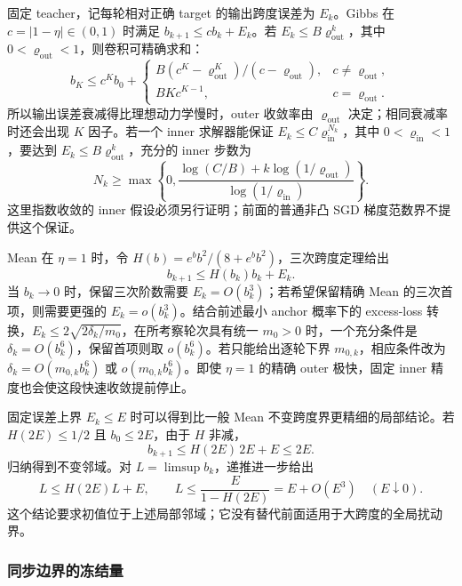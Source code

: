 \documentclass[lang=cn,scheme=chinese,openany]{../book/elegantbook}
\begin{document}
固定 teacher，记每轮相对正确 target 的输出跨度误差为 $E_k$。Gibbs 在 $c=|1-\eta|\in(0,1)$ 时满足 $b_{k+1}\le cb_k+E_k$。若 $E_k\le B\varrho_{\mathrm{out}}^k$，其中 $0<\varrho_{\mathrm{out}}<1$，则卷积可精确求和：
\begin{equation*}
 b_K\le c^Kb_0+
 \begin{cases}
 B(c^K-\varrho_{\mathrm{out}}^K)/(c-\varrho_{\mathrm{out}}),&c\ne\varrho_{\mathrm{out}},\\
 BKc^{K-1},&c=\varrho_{\mathrm{out}}.
 \end{cases}
\end{equation*}
所以输出误差衰减得比理想动力学慢时，outer 收敛率由 $\varrho_{\mathrm{out}}$ 决定；相同衰减率时还会出现 $K$ 因子。若一个 inner 求解器能保证 $E_k\le C\varrho_{\mathrm{in}}^{N_k}$，其中 $0<\varrho_{\mathrm{in}}<1$，要达到 $E_k\le B\varrho_{\mathrm{out}}^k$，充分的 inner 步数为
\begin{equation*}
 N_k\ge\max\left\{0,
 \frac{\log(C/B)+k\log(1/\varrho_{\mathrm{out}})}{\log(1/\varrho_{\mathrm{in}})}\right\}.
\end{equation*}
这里指数收敛的 inner 假设必须另行证明；前面的普通非凸 SGD 梯度范数界不提供这个保证。

Mean 在 $\eta=1$ 时，令 $H(b)=e^bb^2/(8+e^bb^2)$，三次跨度定理给出
\begin{equation*}
 b_{k+1}\le H(b_k)b_k+E_k.
\end{equation*}
当 $b_k\to0$ 时，保留三次阶数需要 $E_k=O(b_k^3)$；若希望保留精确 Mean 的三次首项，则需要更强的 $E_k=o(b_k^3)$。结合前述最小 anchor 概率下的 excess-loss 转换，$E_k\le2\sqrt{2\delta_k/m_0}$，在所考察轮次具有统一 $m_0>0$ 时，一个充分条件是 $\delta_k=O(b_k^6)$，保留首项则取 $o(b_k^6)$。若只能给出逐轮下界 $m_{0,k}$，相应条件改为 $\delta_k=O(m_{0,k}b_k^6)$ 或 $o(m_{0,k}b_k^6)$。即使 $\eta=1$ 的精确 outer 极快，固定 inner 精度也会使这段快速收敛提前停止。

固定误差上界 $E_k\le E$ 时可以得到比一般 Mean 不变跨度界更精细的局部结论。若 $H(2E)\le1/2$ 且 $b_0\le2E$，由于 $H$ 非减，
\begin{equation*}
 b_{k+1}\le H(2E)\,2E+E\le2E.
\end{equation*}
归纳得到不变邻域。对 $L=\limsup b_k$，递推进一步给出
\begin{equation*}
 L\le H(2E)L+E,
 \qquad L\le\frac{E}{1-H(2E)}=E+O(E^3)
 \quad(E\downarrow0).
\end{equation*}
这个结论要求初值位于上述局部邻域；它没有替代前面适用于大跨度的全局扰动界。

\subsubsection{同步边界的冻结量}
\end{document}
